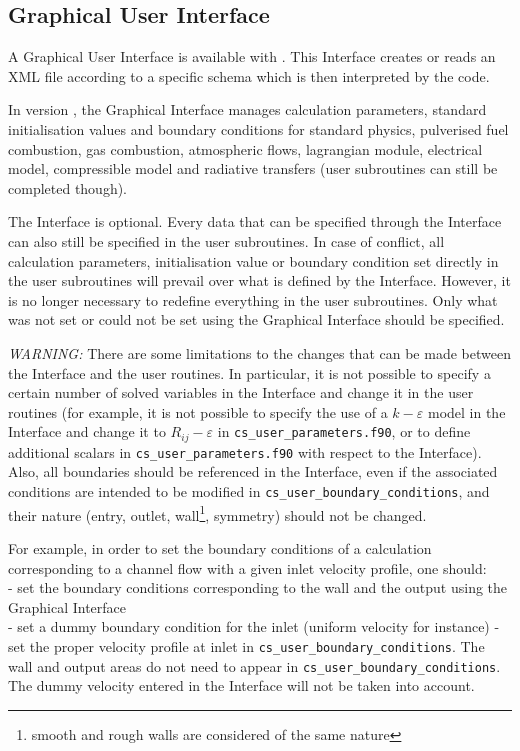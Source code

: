 {{{%
\subsection{Graphical User Interface}
\label{prg_gui}%
A Graphical User Interface is available with \CS.
This Interface creates or reads an XML file according to
a specific \CS schema which is then interpreted by the code.

In version \verscs, the Graphical Interface manages calculation parameters,
standard initialisation values and boundary
conditions for standard physics, pulverised fuel combustion, gas combustion, 
atmospheric flows, lagrangian module,  electrical model, compressible model and radiative
transfers (user subroutines can still be completed though).

The Interface is optional. Every data that can be specified through the
Interface can also still be specified in the user subroutines. In case of
conflict, all calculation parameters, initialisation value or boundary condition
set directly in the user subroutines will prevail over what is defined by the
Interface. However, it is no longer necessary to redefine everything in the
user subroutines. Only what was not set or could not be set using the Graphical
Interface should be specified.

{\em WARNING: }
There are some limitations to the changes that can be made between the Interface
and the user routines. In particular, it is not possible to specify a certain
number of solved variables in the Interface and change it in the user routines
(for example, it is not possible to specify the use of a $k-\varepsilon$ model
in the Interface and change it to $R_{ij}-\varepsilon$ in \texttt{cs\_user\_parameters.f90}, or
to define additional scalars in \texttt{cs\_user\_parameters.f90} with respect to the
Interface). Also, all boundaries should be referenced in the Interface, even if
the associated conditions are intended to be modified in \texttt{cs\_user\_boundary\_conditions}, and
their nature (entry, outlet, wall\footnote{smooth and rough walls are considered
of the same nature}, symmetry) should not be changed.

For example, in order to set the boundary conditions of a calculation
corresponding to a channel flow with a given inlet velocity profile, one
should:\\
- set the boundary conditions corresponding to the wall and the output
using the Graphical Interface\\
- set a dummy boundary condition for the inlet (uniform velocity for instance)
- set the proper velocity profile at inlet in \texttt{cs\_user\_boundary\_conditions}. The wall and
output areas do not need to appear in \texttt{cs\_user\_boundary\_conditions}. The dummy velocity
entered in the Interface will not be taken into account.

}}}

